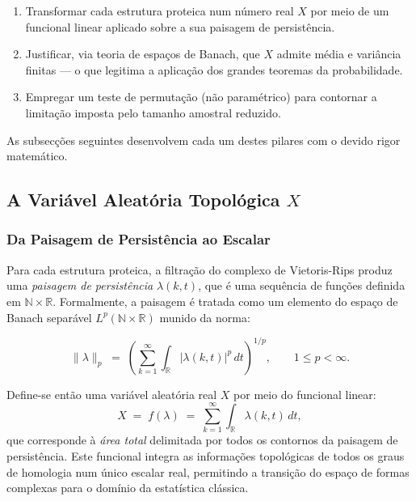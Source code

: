 \documentclass[12pt, a4paper]{article}
\begin{document}
\begin{enumerate}
  \item Transformar cada estrutura proteica num número real $X$ por meio de um funcional linear aplicado sobre a sua paisagem de persistência.
  \item Justificar, via teoria de espaços de Banach, que $X$ admite média e variância finitas — o que legitima a aplicação dos grandes teoremas da probabilidade.
  \item Empregar um teste de permutação (não paramétrico) para contornar a limitação imposta pelo tamanho amostral reduzido.
\end{enumerate}
 
As subsecções seguintes desenvolvem cada um destes pilares com o devido rigor matemático.
 
\subsection{A Variável Aleatória Topológica \texorpdfstring{$X$}{X}}
 
\subsubsection{Da Paisagem de Persistência ao Escalar}
 
Para cada estrutura proteica, a filtração do complexo de Vietoris-Rips produz uma \emph{paisagem de persistência} $\lambda(k, t)$, que é uma sequência de funções definida em $\mathbb{N} \times \mathbb{R}$. Formalmente, a paisagem é tratada como um elemento do espaço de Banach separável $L^p(\mathbb{N} \times \mathbb{R})$ munido da norma:

\begin{equation*}
  \|\lambda\|_{p} \;=\; \left( \sum_{k=1}^{\infty} \int_{\mathbb{R}} |\lambda(k,t)|^{p}\, dt \right)^{1/p}, \qquad 1 \le p < \infty.
\end{equation*}
 
Define-se então uma variável aleatória real $X$ por meio do funcional linear:
\begin{equation*} \label{eq:X_area}
  X \;=\; f(\lambda) \;=\; \sum_{k=1}^{\infty} \int_{\mathbb{R}} \lambda(k,t)\, dt,
\end{equation*}
que corresponde à \emph{área total} delimitada por todos os contornos da paisagem de persistência. Este funcional integra as informações topológicas de todos os graus de homologia num único escalar real, permitindo a transição do espaço de formas complexas para o domínio da estatística clássica.
 
\end{document}
